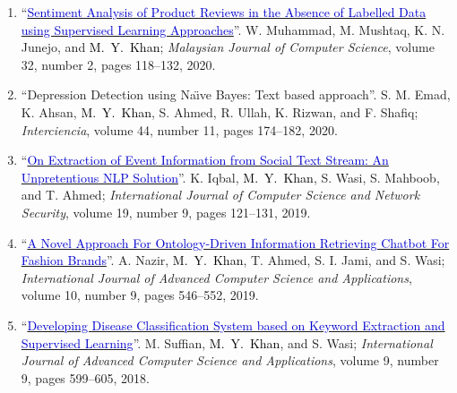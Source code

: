 \documentclass[a4paper, 10pt]{article}
\begin{document}
\begin{enumerate}[J\arabic*.]
\item ``\href{https://doi.org/10.22452/mjcs.vol33no2.3}{\textcolor{MediumBlue}{Sentiment Analysis of Product Reviews in the Absence of Labelled Data using Supervised Learning Approaches}}''. W. Muhammad, M. Mushtaq, K. N. Junejo, and \textcolor{Black}{M.~Y.~Khan}; \emph{Malaysian Journal of Computer Science}, volume 32, number 2, pages 118--132, 2020. \qthreetag{\textcolor{white}{\textsf\bfseries Q3}}  

\item ``Depression Detection using Na\"{\i}ve Bayes: Text based approach''. S. M. Emad, K. Ahsan, \textcolor{Black}{M.~Y.~Khan}, S. Ahmed, R. Ullah, K. Rizwan, and F. Shafiq; \emph{Interciencia}, volume 44, number 11, pages 174--182, 2020. \qtwotag{\textcolor{white}{\textsf\bfseries Q2}}  

\item ``\href{http://paper.ijcsns.org/07_book/201909/20190915.pdf}{\textcolor{MediumBlue}{On Extraction of Event Information from Social Text Stream: An Unpretentious NLP Solution}}''. K. Iqbal, \textcolor{Black}{M.~Y.~Khan}, S. Wasi, S. Mahboob, and T. Ahmed; \emph{International Journal of Computer Science and Network Security}, volume 19, number 9, pages 121--131, 2019.  

\item ``\href{https://doi.org/10.14569/IJACSA.2019.0100972}{\textcolor{MediumBlue}{A Novel Approach For Ontology-Driven Information Retrieving Chatbot For Fashion Brands}}''. A. Nazir, \textcolor{Black}{M.~Y.~Khan}, T. Ahmed, S. I. Jami, and S. Wasi; \emph{International Journal of Advanced Computer Science and Applications}, volume 10, number 9, pages 546--552, 2019. \qthreetag{\textcolor{white}{\textsf\bfseries Q3}} 

\item ``\href{https://doi.org/10.14569/IJACSA.2018.090976}{\textcolor{MediumBlue}{Developing Disease Classification System based on Keyword Extraction and Supervised Learning}}''. M. Suffian, \textcolor{Black}{M.~Y.~Khan}, and S. Wasi; \emph{International Journal of Advanced Computer Science and Applications}, volume 9, number 9, pages 599--605, 2018. %
\end{enumerate}
\end{document}

